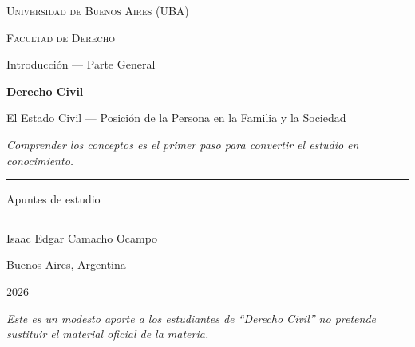 \documentclass[12pt,oneside]{book}
\newcommand{\universidad}{Universidad de Buenos Aires (UBA)}
\newcommand{\facultad}{Facultad de Derecho}
\newcommand{\materia}{Derecho Civil}
\newcommand{\titulo}{El Estado Civil — Posición de la Persona en la Familia y la Sociedad}
\newcommand{\autor}{Isaac Edgar Camacho Ocampo}
\newcommand{\anio}{2026}
\begin{document}
\begin{titlepage}

\thispagestyle{empty}

\begin{center}

\vspace*{1cm}

{\large \textsc{\universidad}}

\vspace{0.2cm}

{\large \textsc{\facultad}}

\vspace{0.2cm}

{\large Introducción — Parte General}

\vspace{3cm}

{\Huge \textbf{\materia}}

\vspace{1cm}

{\LARGE \titulo}

\vspace{0.8cm}

\textit{Comprender los conceptos es el primer paso para convertir el estudio en conocimiento.}

\vspace{1.2cm}

\rule{0.70\textwidth}{0.5pt}

\vspace{0.5cm}

{\large Apuntes de estudio}

\vspace{0.5cm}

\rule{0.70\textwidth}{0.5pt}

\vfill

{\large \autor}

\vspace{0.3cm}

{\large Buenos Aires, Argentina}

\vspace{0.2cm}

{\large \anio}

\end{center}

\vfill

\begin{flushleft}
\textit{Este es un modesto aporte a los estudiantes de ``Derecho Civil'' no pretende sustituir el material oficial de la materia.}
\end{flushleft}

\end{titlepage}
\end{document}
